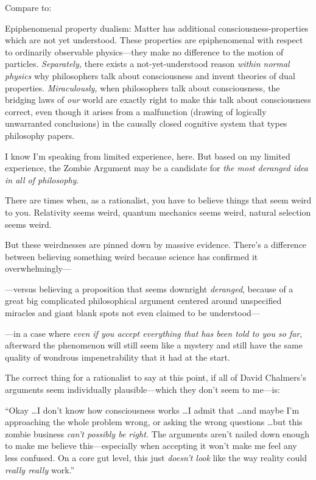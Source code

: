 {
 Compare to:}

{
 Epiphenomenal property dualism: Matter has additional
consciousness-properties which are not yet understood. These properties
are epiphenomenal with respect to ordinarily observable physics---they
make no difference to the motion of particles. \textit{Separately,}
there exists a not-yet-understood reason \textit{within normal physics}
why philosophers talk about consciousness and invent theories of dual
properties. \textit{Miraculously,} when philosophers talk about
consciousness, the bridging laws of \textit{our} world are exactly
right to make this talk about consciousness correct, even though it
arises from a malfunction (drawing of logically unwarranted
conclusions) in the causally closed cognitive system that types
philosophy papers. }

{
 I know I'm speaking from limited experience, here.
But based on my limited experience, the Zombie Argument may be a
candidate for \textit{the most deranged idea in all of philosophy}.}

{
 There are times when, as a rationalist, you have to believe things
that seem weird to you. Relativity seems weird, quantum mechanics seems
weird, natural selection seems weird.}

{
 But these weirdnesses are pinned down by massive evidence.
There's a difference between believing something weird
because science has confirmed it overwhelmingly---}

{
 {}---versus believing a proposition that seems downright
\textit{deranged}, because of a great big complicated philosophical
argument centered around unspecified miracles and giant blank spots not
even claimed to be understood---}

{
 {}---in a case where \textit{even if you accept everything that
has been told to you so far}, afterward the phenomenon will still seem
like a mystery and still have the same quality of wondrous
impenetrability that it had at the start.}

{
 The correct thing for a rationalist to say at this point, if all
of David Chalmers's arguments seem individually
plausible---which they don't seem to me---is:}

{
 ``Okay \ldots I don't know how
consciousness works \ldots I admit that \ldots and maybe
I'm approaching the whole problem wrong, or asking the
wrong questions \ldots but this zombie business
\textit{can't possibly be right.} The arguments
aren't nailed down enough to make me believe
this---especially when accepting it won't make me feel
any less confused. On a core gut level, this just
\textit{doesn't look} like the way reality could
\textit{really really} work.''}

